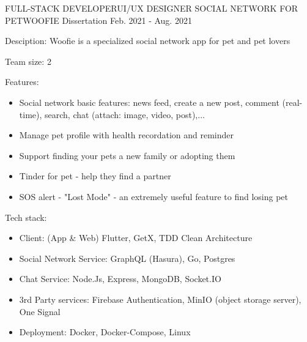 

\begin{cventries}

  \cventry
    {FULL-STACK DEVELOPER{\enskip\cdotp\enskip}UI/UX DESIGNER} %
    {SOCIAL NETWORK FOR PET{\enskip\cdotp\enskip}WOOFIE} %
    {Dissertation} %
    {Feb. 2021 - Aug. 2021} %
    {
      \begin{cvitems} %
        \item {Desciption: Woofie is a specialized social network app for pet and pet lovers}
        \item {Team size: 2}
        \item {Features:}
            \begin{itemize}
                \item {Social network basic features: news feed, create a new post, comment (real-time), search, chat (attach: image, video, post),...}
                \item {Manage pet profile with health recordation and reminder}
                \item {Support finding your pets a new family or adopting them}
                \item {Tinder for pet - help they find a partner}
                \item {SOS alert - "Lost Mode" - an extremely useful feature to find losing pet}
            \end{itemize}
        \item {Tech stack: }
            \begin{itemize}
                \item {Client: (App \& Web) Flutter, GetX, TDD Clean Architecture}
                \item {Social Network Service: GraphQL (Hasura), Go, Postgres}
                \item {Chat Service: Node.Js, Express, MongoDB, Socket.IO}
                \item {3rd Party services: Firebase Authentication, MinIO (object storage server), One Signal}
                \item {Deployment: Docker, Docker-Compose, Linux}
            \end{itemize}
      \end{cvitems}
    }
\end{cventries}


